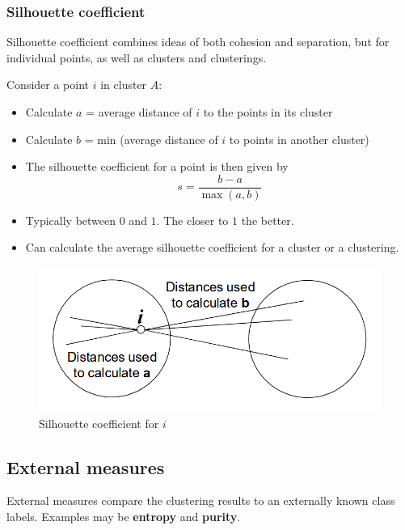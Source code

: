 \subsubsection{Silhouette coefficient}
Silhouette coefficient combines ideas of both cohesion and separation,
but for individual points, as well as clusters and clusterings.
\begin{paracol}{2}

	Consider a point $i$ in cluster $A$:
	\begin{itemize}
		\item Calculate $a$ = average distance of $i$ to the points in its cluster
		\item Calculate $b$ = min (average distance of $i$ to points in another cluster)
		\item The silhouette coefficient for a point is then given by
		      \[
			      s = \frac{b - a}{\max(a,b)}
		      \]
		\item Typically between $0$ and $1$. The closer to $1$ the better.
		\item Can calculate the average silhouette coefficient for a cluster or a clustering.
	\end{itemize}
	\switchcolumn

   \colfill
	\begin{figure}[htbp]
		\centering
		\includegraphics[width=0.95\columnwidth]{images/05/silhouette.png}
		\caption{Silhouette coefficient for $i$}
		\label{fig:05/silhouette}
	\end{figure}
   \colfill
\end{paracol}

\subsection{External measures}
External measures compare the clustering results to an externally known class labels. Examples may be \textbf{entropy} and \textbf{purity}.

